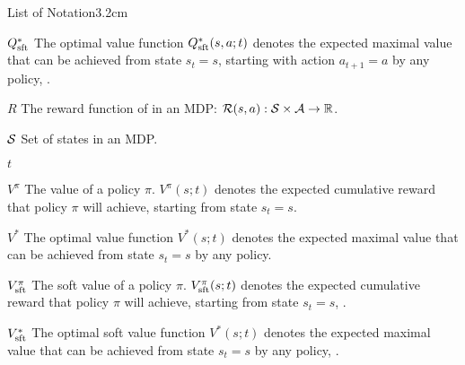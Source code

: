 \begin{mclistof}{List of Notation}{3.2cm}
    \item[$Q_{\textnormal{sft}}^*$]
        The optimal value function $Q_{\textnormal{sft}}^*(s,a;t)$ denotes the expected maximal value that can be achieved from state $s_t=s$, starting with action $a_{t+1}=a$ by any policy, .
    \item[$R$] 
        The reward function of in an MDP: $\mathcal{R}(s,a) : \mathcal{S}\times \mathcal{A}\rightarrow \mathbb{R}$.
    \item[$\mathcal{S}$] 
        Set of states in an MDP. 
    \item[$t$] 
    \item[$V^{\pi}$]
        The value of a policy $\pi$. $V^{\pi}(s;t)$ denotes the expected cumulative reward that policy $\pi$ will achieve, starting from state $s_t=s$.
    \item[$V^*$]
        The optimal value function $V^*(s;t)$ denotes the expected maximal value that can be achieved from state $s_t=s$ by any policy.
    \item[$V_{\textnormal{sft}}^{\pi}$]
        The soft value of a policy $\pi$. $V_{\textnormal{sft}}^{\pi}(s;t)$ denotes the expected cumulative reward that policy $\pi$ will achieve, starting from state $s_t=s$, .
    \item[$V_{\textnormal{sft}}^*$]
        The optimal soft value function $V^*(s;t)$ denotes the expected maximal value that can be achieved from state $s_t=s$ by any policy, .
    \\
    

\end{mclistof}

